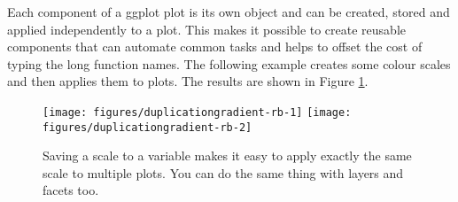 \begin{Shaded}
\begin{Highlighting}[]
  \StringTok{ }
\StringTok{  }\NormalTok{(} \NormalTok{) +}
\StringTok{  }\NormalTok{(}\NormalTok{, }\NormalTok{) +}\StringTok{ }\NormalTok{(}\NormalTok{, }\NormalTok{)}
\end{Highlighting}
\end{Shaded}


Each component of a ggplot plot is its own object and can be created,
stored and applied independently to a plot. This makes it possible to
create reusable components that can automate common tasks and helps to
offset the cost of typing the long function names. The following example
creates some colour scales and then applies them to plots. The results
are shown in Figure \ref{fig:gradient-rb}. 

\begin{Shaded}
\begin{Highlighting}[]
\StringTok{ }\NormalTok{(} \NormalTok{, } \NormalTok{)}
  \StringTok{ }
  \NormalTok{) +}
\StringTok{  }
\end{Highlighting}
\end{Shaded}

\begin{figure}

{\centering \texttt{[image: figures/duplicationgradient-rb-1]} \texttt{[image: figures/duplicationgradient-rb-2]} 

}

\caption{Saving a scale to a variable makes it easy to apply exactly the same scale to multiple plots.  You can do the same thing with layers and facets too.\label{fig:gradient-rb}}
\end{figure}

